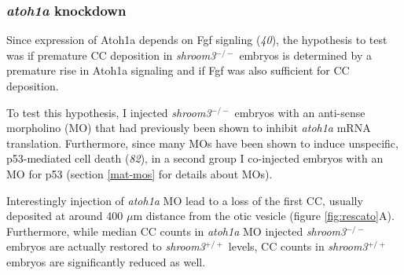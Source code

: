 \documentclass[10pt, b5paper, singlespacinge, twoside]{reedthesis} %
\theoremstyle{definition}
\theoremstyle{definition}
\theoremstyle{definition}
\theoremstyle{remark}
\begin{document}
\hypertarget{atoh1a-knockdown}{%
\subsubsection{\texorpdfstring{\emph{atoh1a} knockdown}{atoh1a knockdown}}\label{atoh1a-knockdown}}

Since expression of Atoh1a depends on Fgf signling (\emph{40}), the hypothesis to test was if premature CC deposition in \emph{shroom3}\(^{-/-}\) embryos is determined by a premature rise in Atoh1a signaling and if Fgf was also sufficient for CC deposition.

To test this hypothesis, I injected \emph{shroom3}\(^{-/-}\) embryos with an anti-sense morpholino (MO) that had previously been shown to inhibit \emph{atoh1a} mRNA translation. Furthermore, since many MOs have been shown to induce unspecific, p53-mediated cell death (\emph{82}), in a second group I co-injected embryos with an MO for p53 (section \ref{mat-mos} for details about MOs).

Interestingly injection of \emph{atoh1a} MO lead to a loss of the first CC, usually deposited at around 400 \(\mu\)m distance from the otic vesicle (figure \ref{fig:rescato}A). Furthermore, while median CC counts in \emph{atoh1a} MO injected \emph{shroom3}\(^{-/-}\) embryos are actually restored to \emph{shroom3}\(^{+/+}\) levels, CC counts in \emph{shroom3}\(^{+/+}\) embryos are significantly reduced as well.\newline
\end{document}
